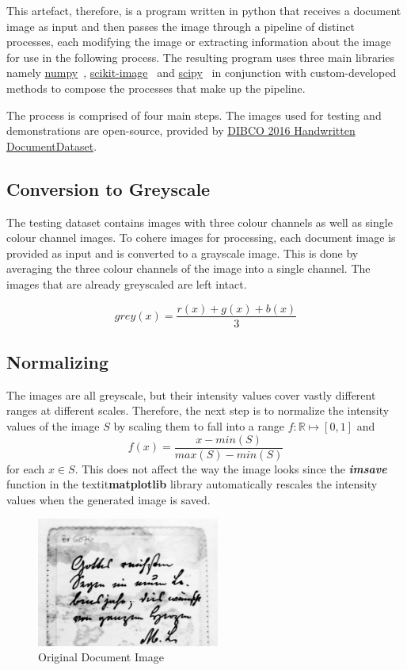 \documentclass[a4paper, 12pt]{report}
\begin{document}
This artefact, therefore, is a program written in python that receives a
document image as input and then passes the image through a pipeline of
distinct processes, each modifying the image or extracting information about
the image for use in the following process. The resulting program uses three
main libraries namely \href{https://numpy.org/}{numpy}~\cite{numpy},
\href{https://scikit-image.org/}{scikit-image}~\cite{scikit-image} and
\href{https://scikit-image.org/}{scipy}~\cite{2020SciPy-NMeth} in conjunction
with custom-developed methods to compose the processes that make up the
pipeline. \par

The process is comprised of four main steps. The images used for testing and
demonstrations are open-source, provided by
\href{https://vc.ee.duth.gr/h-dibco2016/}{DIBCO 2016 Handwritten
    DocumentDataset}.

\subsection{Conversion to Greyscale}
The testing dataset contains images with three colour channels as well as
single colour channel images. To cohere images for processing, each document
image is provided as input and is converted to a grayscale image. This is done
by averaging the three colour channels of the image into a single channel. The
images that are already greyscaled are left intact.

\[grey(x)=\frac{r(x)+g(x)+b(x)}{3}\]

\subsection{Normalizing}
The images are all greyscale, but their intensity values cover vastly different
ranges at different scales. Therefore, the next step is to normalize the
intensity values of the image $S$ by scaling them to fall into a range
$f:\mathbb{R} \mapsto [0,1]$ and
\[f(x)=\frac{x-min(S)}{max(S)-min(S)}\]
for each $x \in S$. This does not affect the way the image looks since the
\textit{\textbf{imsave}} function in the textit{\textbf{matplotlib}} library
automatically rescales the intensity values when the generated image is saved.

\begin{figure}[ht]
    \centering
    \includegraphics[width=6cm]{original.png}
    \caption{Original Document Image}
    \label{fig:1}
\end{figure}
\end{document}
